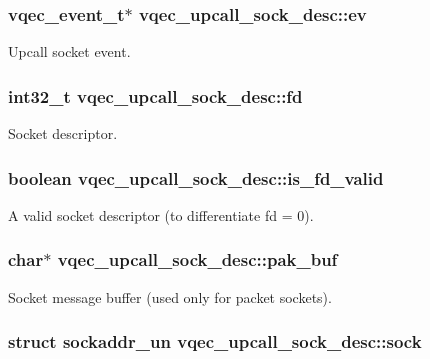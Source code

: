 \subsubsection{\setlength{\rightskip}{0pt plus 5cm}vqec\_\-event\_\-t$\ast$ \bf{vqec\_\-upcall\_\-sock\_\-desc::ev}}\label{structvqec__upcall__sock__desc_22162584453f7fe7789c7ad4213f122c}


Upcall socket event. 
\subsubsection{\setlength{\rightskip}{0pt plus 5cm}int32\_\-t \bf{vqec\_\-upcall\_\-sock\_\-desc::fd}}\label{structvqec__upcall__sock__desc_9259e0973bc1b0b79506ba881222b720}


Socket descriptor. 
\subsubsection{\setlength{\rightskip}{0pt plus 5cm}boolean \bf{vqec\_\-upcall\_\-sock\_\-desc::is\_\-fd\_\-valid}}\label{structvqec__upcall__sock__desc_b1fc39810dae7b6a668c8778cf1627b2}


A valid socket descriptor (to differentiate fd = 0). 
\subsubsection{\setlength{\rightskip}{0pt plus 5cm}char$\ast$ \bf{vqec\_\-upcall\_\-sock\_\-desc::pak\_\-buf}}\label{structvqec__upcall__sock__desc_6dc459142fde9f3d83509d8f0ae834ac}


Socket message buffer (used only for packet sockets). 
\subsubsection{\setlength{\rightskip}{0pt plus 5cm}struct sockaddr\_\-un \bf{vqec\_\-upcall\_\-sock\_\-desc::sock}}\label{structvqec__upcall__sock__desc_4501d8b61e631c8dd680be5e442fc35f}


